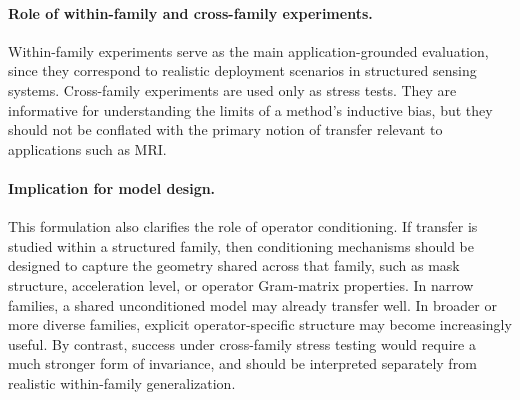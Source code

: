 \documentclass[11pt]{article}
\begin{document}
\paragraph{Role of within-family and cross-family experiments.}
Within-family experiments serve as the main application-grounded evaluation, since they correspond to realistic deployment scenarios in structured sensing systems. Cross-family experiments are used only as stress tests. They are informative for understanding the limits of a method's inductive bias, but they should not be conflated with the primary notion of transfer relevant to applications such as MRI.

\paragraph{Implication for model design.}
This formulation also clarifies the role of operator conditioning. If transfer is studied within a structured family, then conditioning mechanisms should be designed to capture the geometry shared across that family, such as mask structure, acceleration level, or operator Gram-matrix properties. In narrow families, a shared unconditioned model may already transfer well. In broader or more diverse families, explicit operator-specific structure may become increasingly useful. By contrast, success under cross-family stress testing would require a much stronger form of invariance, and should be interpreted separately from realistic within-family generalization.
\end{document}
